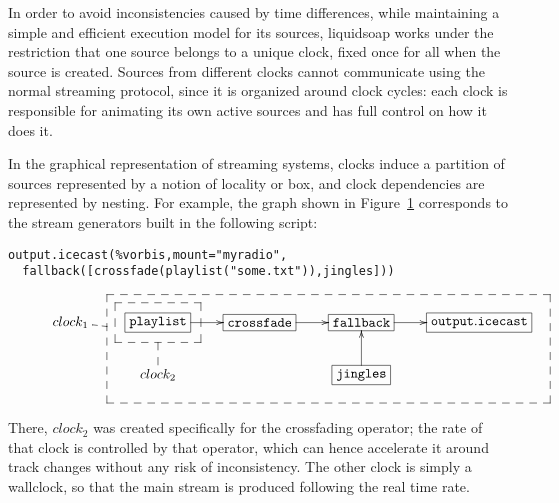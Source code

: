 In order to avoid inconsistencies caused by time differences,
while maintaining a simple and efficient execution model for
its sources, liquidsoap works under the restriction that
one source belongs to a unique clock,
fixed once for all when the source is created.
Sources from different clocks cannot communicate using the normal
streaming protocol, since it is organized around clock cycles:
each clock is responsible for animating its own active sources
and has full control on how it does it.

In the graphical representation of streaming systems,
clocks induce a partition of sources represented by a notion of locality
or box, and clock dependencies are represented by nesting.
For example, the graph shown in Figure~\ref{fig:boxes}
corresponds to the stream generators built in the following
script:
\begin{verbatim}
output.icecast(%vorbis,mount="myradio",
  fallback([crossfade(playlist("some.txt")),jingles]))
\end{verbatim}

\begin{figure}[t]
 \begin{center}
\[
\def\f{\save
*+<15pt>[F--]\frm{}\ar @{--} "2,2"\restore}%
\def\g{\save
"2,4"."1,2"."1,5"!C*+<27pt>[F--]\frm{}\ar @{--} "1,1"\restore}%
\xymatrix{
   {clock_1} & *+[F]{\mathtt{playlist}}\ar[r]\f&*+[F]{\mathtt{crossfade}}\ar[r]&  *+[F]{\mathtt{fallback}}\ar[r]&
  *+[F]{\mathtt{output.icecast}}\\
   &{clock_2} &  & *+[F]{\mathtt{jingles}}\ar[u]\g& 
}
\]
\end{center}
 \label{fig:boxes}
\end{figure}

There, $clock_2$
was created specifically for the crossfading
operator; the rate of that clock is controlled by that operator,
which can hence accelerate it around track changes without any
risk of inconsistency.
The other clock is simply a wallclock, so that the main stream
is produced following the real time rate.

